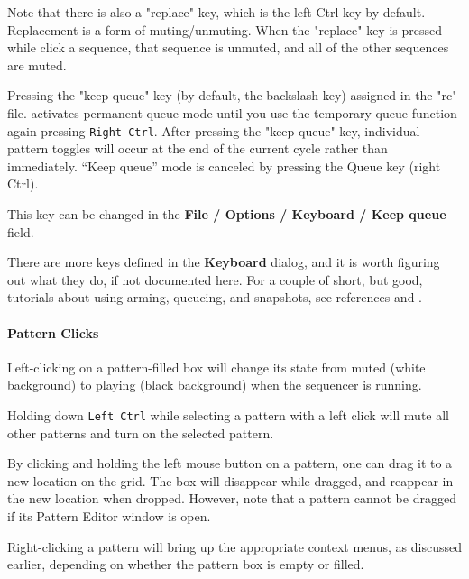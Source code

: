    Note that there is also a "replace" key, which is the left Ctrl key by
   default.  Replacement is a form of muting/unmuting.  When the "replace"
   key is pressed while click a sequence, that sequence is unmuted, and all
   of the other sequences are muted.

	Pressing the "keep queue" key (by default, the backslash key)
   assigned in the "rc" file.
	activates permanent queue mode until you use the temporary 
	queue function again pressing \texttt{Right Ctrl}. 
   After pressing the "keep queue" key, individual pattern
   toggles will occur at the end of the current cycle rather than immediately.
   “Keep queue” mode is canceled by pressing the Queue key (right Ctrl).

   This key can be changed in the
   \textbf{File / Options / Keyboard / Keep queue} field.

   There are more keys defined in the \textbf{Keyboard} dialog, and it is
   worth figuring out what they do, if not documented here.
   For a couple of short, but good, tutorials about using arming, queueing,
   and snapshots, see references \cite{wootangent1}
   and \cite{wootangent2}.

\paragraph{Pattern Clicks}
\label{paragraph:seq64_patterns_pattern_Clicks}

   Left-clicking on a pattern-filled box will change its state
   from muted (white background) to playing (black background) when
   the sequencer is running.

   Holding down \texttt{Left Ctrl} while selecting a pattern
   with a left click will mute all other patterns and turn on the selected
   pattern.

   By clicking and holding the left mouse button on a pattern,
   one can drag it to a new location on the grid.  The box
   will disappear while dragged, and reappear in the new location when
   dropped.  However, note that a pattern cannot be dragged if its
   Pattern Editor window is open.

   Right-clicking a pattern will bring up the appropriate context menus, as
   discussed earlier, depending on whether the pattern box is empty or
   filled.

